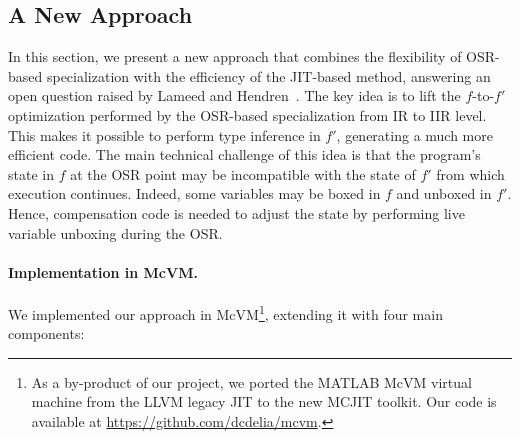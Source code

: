 
\subsection{A New Approach}
\label{ss:eval-opt-mcvm}

In this section, we present a new approach that combines the flexibility of OSR-based specialization with the efficiency of the JIT-based method, answering an open question raised by Lameed and Hendren~\cite{lameed2013feval}. The key idea is to lift the $f$-to-$f'$ optimization performed by the OSR-based specialization from IR to IIR level. This makes it possible to perform type inference in $f'$, generating a much more efficient code. The main technical challenge of this idea is that the program's state in $f$ at the OSR point may be incompatible with the state of $f'$ from which execution continues. Indeed, some variables may be boxed in $f$ and unboxed in $f'$. Hence, compensation code is needed to adjust the state by performing live variable unboxing during the OSR.



\paragraph{Implementation in McVM.}
We implemented our approach in McVM\footnote{As a by-product of our project, we ported the MATLAB McVM virtual machine from the LLVM legacy JIT to the new MCJIT toolkit. Our code is available at \url{https://github.com/dcdelia/mcvm}.}, extending it with four main components:

